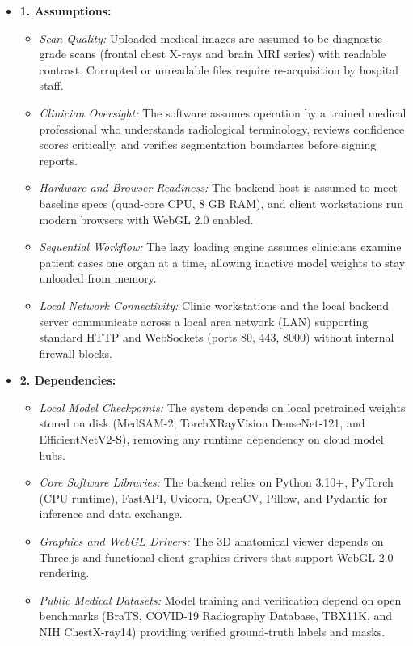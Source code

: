 \documentclass[12pt,a4paper]{report}
\begin{document}
\begin{itemize}[leftmargin=1.2em]
    \item \textbf{1. Assumptions:}
    \begin{itemize}[leftmargin=1.2em]
        \item \textit{Scan Quality:} Uploaded medical images are assumed to be diagnostic-grade scans (frontal chest X-rays and brain MRI series) with readable contrast. Corrupted or unreadable files require re-acquisition by hospital staff.
        \item \textit{Clinician Oversight:} The software assumes operation by a trained medical professional who understands radiological terminology, reviews confidence scores critically, and verifies segmentation boundaries before signing reports.
        \item \textit{Hardware and Browser Readiness:} The backend host is assumed to meet baseline specs (quad-core CPU, 8 GB RAM), and client workstations run modern browsers with WebGL 2.0 enabled.
        \item \textit{Sequential Workflow:} The lazy loading engine assumes clinicians examine patient cases one organ at a time, allowing inactive model weights to stay unloaded from memory.
        \item \textit{Local Network Connectivity:} Clinic workstations and the local backend server communicate across a local area network (LAN) supporting standard HTTP and WebSockets (ports 80, 443, 8000) without internal firewall blocks.
    \end{itemize}

    \item \textbf{2. Dependencies:}
    \begin{itemize}[leftmargin=1.2em]
        \item \textit{Local Model Checkpoints:} The system depends on local pretrained weights stored on disk (MedSAM-2, TorchXRayVision DenseNet-121, and EfficientNetV2-S), removing any runtime dependency on cloud model hubs.
        \item \textit{Core Software Libraries:} The backend relies on Python 3.10+, PyTorch (CPU runtime), FastAPI, Uvicorn, OpenCV, Pillow, and Pydantic for inference and data exchange.
        \item \textit{Graphics and WebGL Drivers:} The 3D anatomical viewer depends on Three.js and functional client graphics drivers that support WebGL 2.0 rendering.
        \item \textit{Public Medical Datasets:} Model training and verification depend on open benchmarks (BraTS, COVID-19 Radiography Database, TBX11K, and NIH ChestX-ray14) providing verified ground-truth labels and masks.
    \end{itemize}
\end{itemize}
\end{document}
